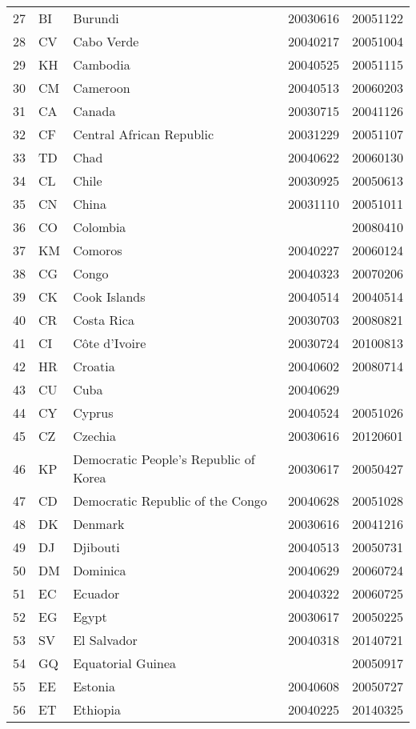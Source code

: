 \begin{longtable}{rllrr}
  27 & BI & Burundi & 20030616 & 20051122 \\ 
  28 & CV & Cabo Verde & 20040217 & 20051004 \\ 
  29 & KH & Cambodia & 20040525 & 20051115 \\ 
  30 & CM & Cameroon & 20040513 & 20060203 \\ 
  31 & CA & Canada & 20030715 & 20041126 \\ 
  32 & CF & Central African Republic & 20031229 & 20051107 \\ 
  33 & TD & Chad & 20040622 & 20060130 \\ 
  34 & CL & Chile & 20030925 & 20050613 \\ 
  35 & CN & China & 20031110 & 20051011 \\ 
  36 & CO & Colombia &  & 20080410 \\ 
  37 & KM & Comoros & 20040227 & 20060124 \\ 
  38 & CG & Congo & 20040323 & 20070206 \\ 
  39 & CK & Cook Islands & 20040514 & 20040514 \\ 
  40 & CR & Costa Rica & 20030703 & 20080821 \\ 
  41 & CI & Côte d'Ivoire & 20030724 & 20100813 \\ 
  42 & HR & Croatia & 20040602 & 20080714 \\ 
  43 & CU & Cuba & 20040629 &  \\ 
  44 & CY & Cyprus & 20040524 & 20051026 \\ 
  45 & CZ & Czechia & 20030616 & 20120601 \\ 
  46 & KP & Democratic People's Republic of Korea & 20030617 & 20050427 \\ 
  47 & CD & Democratic Republic of the Congo & 20040628 & 20051028 \\ 
  48 & DK & Denmark & 20030616 & 20041216 \\ 
  49 & DJ & Djibouti & 20040513 & 20050731 \\ 
  50 & DM & Dominica & 20040629 & 20060724 \\ 
  51 & EC & Ecuador & 20040322 & 20060725 \\ 
  52 & EG & Egypt & 20030617 & 20050225 \\ 
  53 & SV & El Salvador & 20040318 & 20140721 \\ 
  54 & GQ & Equatorial Guinea &  & 20050917 \\ 
  55 & EE & Estonia & 20040608 & 20050727 \\ 
  56 & ET & Ethiopia & 20040225 & 20140325 \\ 

\end{longtable}
